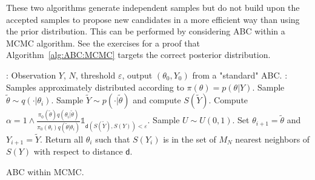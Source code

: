 \documentclass[english,graybox,envcountchap,envcountsame,sectrefs,shortlabels]{svmono}
\theoremstyle{style}
\begin{document}
These two algorithms generate independent samples but do not build upon the accepted samples to propose new candidates in a more efficient way than using the prior distribution. This can be performed by considering  ABC within a MCMC algorithm. See the exercises for a proof that Algorithm~\ref{alg:ABC:MCMC} targets the correct posterior distribution.

\medskip

\begin{algorithm}
\centering
\begin{algorithmic}
: Observation $Y$, $N$, threshold $\varepsilon$,  output $(\theta_0,Y_0)$ from a "standard" ABC.
: Samples approximately distributed according to $\pi(\theta)= p(\theta | Y)$.
\State Sample $\widetilde \theta \sim q(\cdot |\theta_i)$.
\State Sample $\widetilde Y \sim p(\cdot|\widetilde \theta)$ and compute $S(\widetilde Y)$.
\State Compute $\alpha = 1\wedge \frac{\pi_0(\widetilde \theta) q(\theta_i|\widetilde \theta)}{\pi_0(\theta_i) q(\widetilde\theta| \theta_i)}\mathds{1}_{\mathsf{d}(S(\tilde Y),S(Y))<\varepsilon}$.
\State Sample $U\sim U(0,1)$.
\State Set $\theta_{i+1} = \widetilde \theta$ and $Y_{i+1} = \widetilde Y$.
\EndIf
\EndFor
\State Return all $\theta_i$ such that $S(Y_i)$ is in the set of $M_N$ nearest neighbors of $S(Y)$ with respect to distance $\mathsf{d}$.
\end{algorithmic}
\label{alg:ABC:MCMC}
\caption{ABC within MCMC.}
\end{algorithm}

\end{document}
